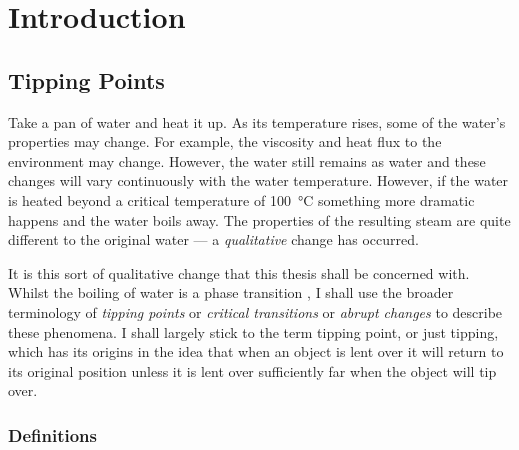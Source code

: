 \chapter{Introduction}
\graphicspath{{introduction/figs}}

\section{Tipping Points}
Take a pan of water and heat it up. As its temperature rises, some of the water's properties may change. For example, the viscosity and heat flux to the
environment may change. However, the water still remains as water and these changes will vary continuously with the water temperature. However, if the water is heated beyond
a critical temperature of \SI{100}{\degreeCelsius} something more dramatic happens and the water boils away. The properties of the resulting steam are quite different
to the original water --- a \emph{qualitative} change has occurred.

It is this sort of qualitative change that this thesis shall be concerned with. Whilst the boiling of water is a phase transition \parencite{Goldenfeld1992}, I shall use the broader terminology
of \emph{tipping points} \parencite{Lenton2008} or \emph{critical transitions} \parencite{Rahmstorf1995} or \emph{abrupt changes} \parencite{Alley2003} to describe these phenomena. I shall largely stick
to the term tipping point, or just tipping, which has its origins in the idea that when an object is lent over it will return to its original position unless it is lent over sufficiently far when the object
will tip over.

\subsection{Definitions}

